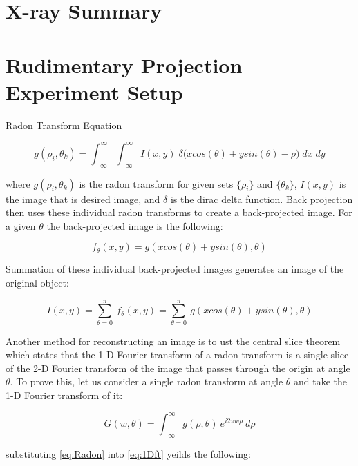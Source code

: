 \section{X-ray Summary}

\section{Rudimentary Projection Experiment Setup}

Radon Transform Equation

\begin{equation}
g(\rho_i,\theta_k) = \int_{-\infty}^{\infty} \int_{-\infty}^{\infty} I(x,y) \; \delta \big(xcos(\theta) + ysin(\theta) - \rho \big) \; dx \; dy
\label{eq:Radon}
\end{equation}

\noindent
where $g(\rho_i,\theta_k)$ is the radon transform for given sets $\{\rho_i\}$ and $\{\theta_k\}$, $I(x,y)$ is the image that is desired image, and $\delta$ is the dirac delta function. Back projection then uses these individual radon transforms to create a back-projected image.  For a given $\theta$ the back-projected image is the following:

\begin{equation}
f_{\theta}(x,y) = g(xcos(\theta) + ysin(\theta), \theta)
\end{equation}

\noindent
Summation of these individual back-projected images generates an image of the original object:

\begin{equation}
I(x,y) = \sum_{\theta=0}^{\pi} \: f_{\theta}(x,y) = \sum_{\theta=0}^{\pi} \: g(xcos(\theta) + ysin(\theta), \theta)
\end{equation}

Another method for reconstructing an image is to ust the central slice theorem which states that the 1-D Fourier transform of a radon transform is a single slice of the 2-D Fourier transform of the image that passes through the origin at angle $\theta$. To prove this, let us consider a single radon transform at angle $\theta$ and take the 1-D Fourier transform of it:

\begin{equation}
G(w,\theta) = \int_{-\infty}^{\infty} g(\rho,\theta) \: e^{i2\pi  w \rho} \: d\rho
\label{eq:1Dft}
\end{equation}

\noindent
substituting \ref{eq:Radon} into \ref{eq:1Dft} yeilds the following:

